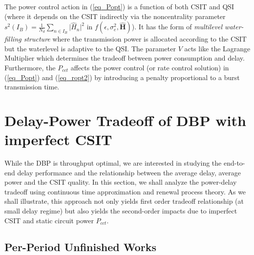 \documentclass[11pt,journal, onecolumn]{./IEEEtran}
\newcommand{\red}{\color{black}}
\begin{document}
\begin{Remark}
The power control action in (\ref{eq_Popt}) is a function of both CSIT and QSI (where it depends on the CSIT indirectly via the noncentrality parameter ${s^2}({I_B}) = \frac{1}{{{N_d}}}\sum\nolimits_{n \in {I_B}} {|{{\widehat H}_n}{|^2}}$ in $f(\epsilon,\sigma_e^2,\mathbf{\hat{H}})$). It has the form of \emph{multilevel water-filling structure} where the transmission power is allocated according to the CSIT but the waterlevel is adaptive to the QSI. The parameter $V$ acts like the Lagrange Multiplier which determines the tradeoff between power consumption and delay. Furthermore, the $P_{cct}$ affects the power control (or rate control solution) in (\ref{eq_Popt}) and (\ref{eq_ropt2}) by introducing a penalty proportional to a burst transmission time. ~\hfill\IEEEQED
\end{Remark}








\section{Delay-Power Tradeoff of DBP with imperfect CSIT}

While the DBP is throughput optimal, we are interested in studying the end-to-end delay performance and the relationship between the average delay, average power and the CSIT quality.
In this section, we shall analyze the power-delay tradeoff using continuous time approximation and renewal process theory. {\red As we shall illustrate, this approach not only yields first order tradeoff relationship (at small delay regime) but also yields the second-order impacts due to imperfect CSIT and static circuit power $P_{cct}$.}

\subsection{Per-Period Unfinished Works}
\end{document}

